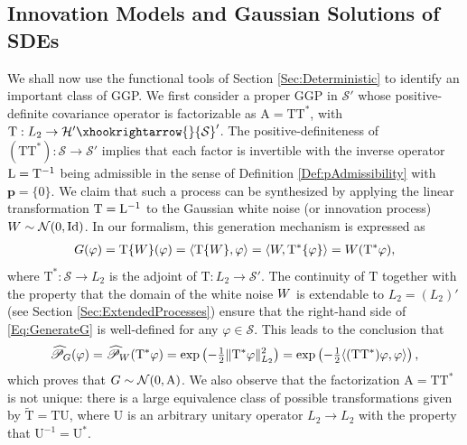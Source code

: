 \documentclass[11pt, english,english]{article}
\newcommand{\Lop}{{\rm L}}
\def\V#1{{\boldsymbol{#1}}}         %
\def\Spc#1{{\mathcal{#1}}}  %
\def\Op#1{{\mathrm{#1}}}  %
\def\Prob{\mathscr{P}}
\def\Form{\widehat{\Prob}}
\def\Identity{\mathrm{Id}} %
\newcommand{\embedC}{\xhookrightarrow{}}
\renewcommand{\[}{\begin{equation}}
\renewcommand{\]}[1]{\label{eq:#1}\end{equation}}
\def\Prob{\mathscr{P}}
\def\Form{\widehat{\Prob}}
\def\gRand#1{{\uppercase{ #1}}}         %
\begin{document}
\subsection{Innovation Models and Gaussian Solutions of SDEs}
\label{Sec:GaussianSDE}
We shall now use the functional tools of Section \ref{Sec:Deterministic} to identify an important class of GGP.
We first consider a proper GGP in $\Spc S'$ whose positive-definite covariance operator is factorizable as $\Op A=\Op T\Op T^\ast$, with $\Op T: L_2 \to  \Spc H'\embedC \Spc S'$.
The positive-definiteness of $(\Op T\Op T^\ast): \Spc S\to \Spc S'$ implies that each factor is invertible
with the inverse operator $\Lop=\Op T^{-1}$ being admissible in the sense of Definition \ref{Def:pAdmissibility} with $\V p=\{0\}$.
We claim that such a process can be synthesized by applying the linear transformation  $\Op T=\Lop^{-1}$ to the Gaussian white noise (or innovation process) $\gRand w\sim \Spc N(0,\Identity)$. In our formalism, this generation mechanism is expressed as
% 
\begin{align}
\label{Eq:GenerateG}
\gRand G(\varphi)=\Op T\{\gRand W\}(\varphi)=\langle\Op T\{\gRand W\},\varphi\rangle=
\langle\gRand W,\Op T^\ast\{\varphi\}\rangle=\gRand w(\Op T^\ast\varphi),
\end{align}
where $\Op T^\ast: \Spc S \to L_2$ is the adjoint of $\Op T: L_2 \to \Spc S'$.
The continuity of $\Op T$ together with the property that the domain of the white noise $\gRand w$ is extendable to $L_2=(L_2)'$ (see Section \ref{Sec:ExtendedProcesses}) ensure that the right-hand side of \eqref{Eq:GenerateG} is well-defined for any $\varphi \in \Spc S$.
This leads to the conclusion that
\begin{align*}
\Form_{\gRand G}(\varphi)=\Form_{\gRand w}(\Op T^\ast \varphi) 
=\exp\left(-\tfrac{1}{2} \|\Op T^\ast\varphi\|_{L_2}^2\right)=\exp\left(-\tfrac{1}{2} \langle(\Op T \Op T^\ast) \varphi, \varphi\rangle\right),
\end{align*}
which proves that $\gRand G \sim \Spc N(0, \Op A)$.
We also observe that the factorization $\Op A=\Op T\Op T^\ast$ is not unique: there is a large equivalence class of possible transformations given by
$\tilde{\Op T}=\Op T\Op U $, where $\Op U$ is an arbitrary unitary operator $L_2 \to L_2$ with the property that $\Op U^{-1}=\Op U^\ast$. 

\end{document}
